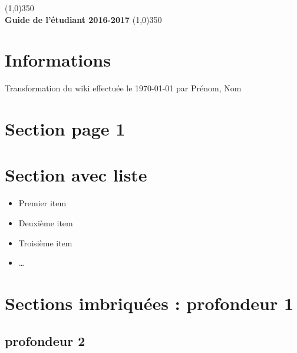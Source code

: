 \documentclass [12 pt]{article}
\begin{document}
\begin{titlepage}
	\begin{center}
	\line(1,0){350}\\
	\huge{\bfseries Guide de l'étudiant 2016-2017}
	\line(1,0){350}
	\vskip10cm
	
	
	\end{center}
\end{titlepage}


\section*{Informations}

\blindtext[1]

Transformation du wiki effectuée le {\today} par Prénom, Nom
\newpage


\tableofcontents
\thispagestyle{empty}






\newpage
\setcounter{page}{1}

\section{Section page 1}\label{sec:1}

	\blindtext[2]


\newpage
\section{Section avec liste}\label{sec:2}
	\blindtext

	\begin{itemize}
	\item Premier item
	\item Deuxième item
	\item Troisième item
	\item \ldots 
	\end{itemize}

\newpage
\section{Sections imbriquées : profondeur 1}\label{sec:3}
	\blindtext[1]

\subsection{ profondeur 2}\label{sec:3.1}
	\blindtext[1]
\end{document}
